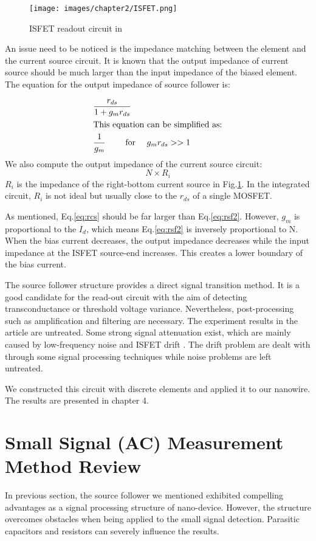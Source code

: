 \begin{figure}[h]
    \centering
    \texttt{[image: images/chapter2/ISFET.png]}
    \fontsize{6}{7}\selectfont
    \caption{ISFET readout circuit in \cite{SF1}}
    \label{fig:ISFET}
\end{figure}

An issue need to be noticed is the impedance matching between the element and the current source circuit.
It is known that the output impedance of current source should be much larger than the input impedance of the biased element.
The equation for the output impedance of source follower is:

\begin{align}
    & \frac{r_{ds}}{1 + g_mr_{ds}}\\
\intertext{This equation can be simplified as:}
    & \frac{1}{g_m} \qquad \text{ for } \quad g_mr_{ds} >> 1 \label{eq:rsf2}
\end{align}
We also compute the output impedance of the current source circuit:
\begin{equation} \label{eq:rcs}
    N\times R_i
\end{equation}
$R_i$ is the impedance of the right-bottom current source in Fig.\ref{fig:ISFET}.
In the integrated circuit, $R_i$ is not ideal but usually close to the $r_{ds}$ of a single MOSFET.

As mentioned, Eq.\ref{eq:rcs} should be far larger than Eq.\ref{eq:rsf2}.
However, $g_m$ is proportional to the $I_d$, which means Eq.\ref{eq:rsf2} is inversely proportional to N.
When the bias current decreases, the output impedance decreases while the input impedance at the ISFET source-end increases.
This creates a lower boundary of the bias current.

The source follower structure provides a direct signal transition method.
It is a good candidate for the read-out circuit with the aim of detecting transconductance or threshold voltage variance.
Nevertheless, post-processing such as amplification and filtering are necessary.
The experiment results in the article are untreated.
Some strong signal attenuation exist, which are mainly caused by low-frequency noise and ISFET drift \cite{Drift}.
The drift problem are dealt with through some signal processing techniques while noise problems are left untreated.

We constructed this circuit with discrete elements and applied it to our nanowire. The results are presented in chapter 4.


\section{Small Signal (AC) Measurement Method Review}
In previous section, the source follower we mentioned exhibited compelling advantages as a signal processing structure of nano-device.
However, the structure overcomes obstacles when being applied to the small signal detection.
Parasitic capacitors and resistors can severely influence the results.

